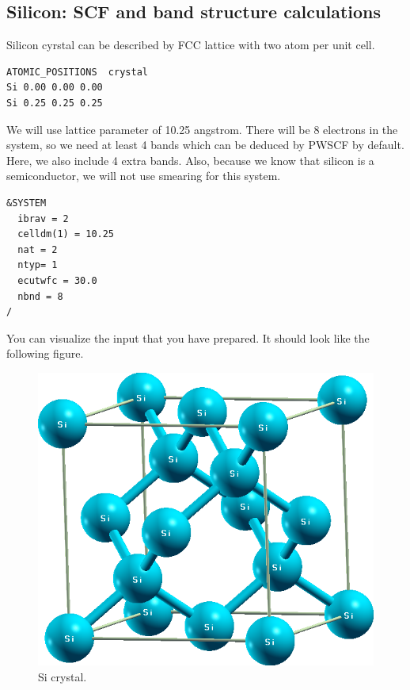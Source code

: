 \documentclass[12pt,english]{paper}
\begin{document}
\subsection{Silicon: SCF and band structure calculations}

Silicon cyrstal can be described by FCC lattice with two atom per
unit cell.

\begin{lstlisting}
ATOMIC_POSITIONS  crystal
Si 0.00 0.00 0.00
Si 0.25 0.25 0.25
\end{lstlisting}


We will use lattice parameter of 10.25 angstrom. There will be 8 electrons
in the system, so we need at least 4 bands which can be deduced by
PWSCF by default. Here, we also include 4 extra bands. Also, because
we know that silicon is a semiconductor, we will not use smearing
for this system.

\begin{lstlisting}
&SYSTEM
  ibrav = 2
  celldm(1) = 10.25
  nat = 2
  ntyp= 1
  ecutwfc = 30.0
  nbnd = 8
/
\end{lstlisting}


You can visualize the input that you have prepared. It should look
like the following figure.

\begin{figure}[H]
\noindent \begin{centering}
\includegraphics[scale=0.2]{images/Si_fcc}
\par\end{centering}

\caption{Si crystal.}
\end{figure}
\end{document}
